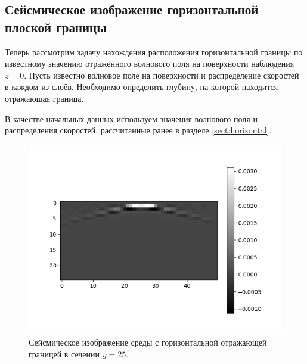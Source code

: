 \documentclass[a4paper, fontsize=14pt]{article}
\begin{document}

	\subsection{Сейсмическое изображение горизонтальной плоской границы}
	Теперь рассмотрим задачу нахождения расположения горизонтальной границы по известному значению отражённого волнового поля на поверхности наблюдения $z=0$. Пусть известно волновое поле на поверхности и распределение скоростей в каждом из слоёв. Необходимо определить глубину, на которой находится отражающая граница. 
	
	 В качестве начальных данных используем значения волнового поля и распределения скоростей, рассчитанные ранее в разделе \ref{sect:horizontal}. 
	
	\begin{figure}[H]
		\centering
		\includegraphics[width=.7\textwidth]{mig_horizontal_single.png}
		\caption{Сейсмическое изображение среды с горизонтальной отражающей границей в сечении $y=25$.}
		\label{fig:mig_hor}
	\end{figure}
	
\end{document}

